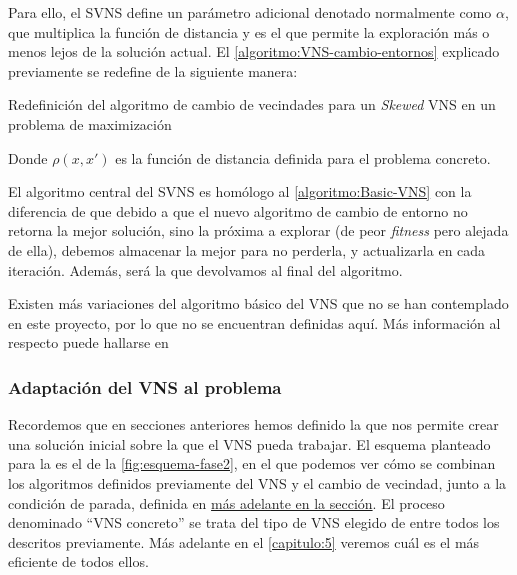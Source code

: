 Para ello, el SVNS define un parámetro adicional denotado normalmente como $\alpha$, que multiplica la función de distancia y es el que permite la exploración más o menos lejos de la solución actual. El \autoref{algoritmo:VNS-cambio-entornos} explicado previamente se redefine de la siguiente manera:

\begin{algorithm}[h]
    \caption{Redefinición del algoritmo de cambio de vecindades para un \textit{Skewed} VNS en un problema de maximización}
    \label{algoritmo:SVNS-cambio-entornos}

    \DontPrintSemicolon
    \bigskip


\end{algorithm}

Donde $\rho(x,x')$ es la función de distancia definida para el problema concreto.

El algoritmo central del SVNS es homólogo al \autoref{algoritmo:Basic-VNS} con la diferencia de que debido a que el nuevo algoritmo de cambio de entorno no retorna la mejor solución, sino la próxima a explorar (de peor \textit{fitness} pero alejada de ella), debemos almacenar la mejor para no perderla, y actualizarla en cada iteración. Además, será la que devolvamos al final del algoritmo.

Existen más variaciones del algoritmo básico del VNS que no se han contemplado en este proyecto, por lo que no se encuentran definidas aquí. Más información al respecto puede hallarse en~\cite{vns,info-adicional-vns}

\subsubsection{Adaptación del VNS al problema}
\label{apartado:adaptacion-VNS}

Recordemos que en secciones anteriores hemos definido la \faseuno{} que nos permite crear una solución inicial sobre la que el VNS pueda trabajar. El esquema planteado para la \fasedos{} es el de la \autoref{fig:esquema-fase2}, en el que podemos ver cómo se combinan los algoritmos definidos previamente del VNS y el cambio de vecindad, junto a la condición de parada, definida en \hyperref[apartado:condiciones-parada]{más adelante en la sección}. El proceso denominado ``VNS concreto'' se trata del tipo de VNS elegido de entre todos los descritos previamente. Más adelante en el \autoref{capitulo:5} veremos cuál es el más eficiente de todos ellos.

